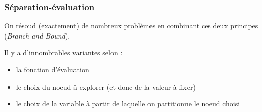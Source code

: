 \documentclass{beamer}
\begin{document}
\begin{frame}
  \frametitle{Séparation-évaluation}

  On résoud (exactement) de nombreux problèmes en combinant ces deux principes
  (\emph{Branch and Bound}).

  Il y a d'innombrables variantes selon :
  \begin{itemize}
  \item la fonction d'évaluation
  \item le choix du noeud à explorer (et donc de la valeur à fixer)
  \item le choix de la variable à partir de laquelle on partitionne le noeud choisi
  \end{itemize}

  
\end{frame}
\end{document}
